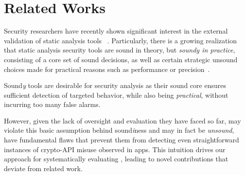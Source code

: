 \section{Related Works}
\label{ch1:sec:relatedworks}

Security researchers have recently shown significant interest in the external validation of static analysis tools
 ~\cite{QWR18,droidbench,iccbench,PBW18,bkm+18}. %
Particularly, there is a growing realization that static analysis security tools are sound in theory, but {\em soundy in practice}, \ie consisting of a core set of sound decisions, as well as certain strategic unsound choices made for practical reasons such as performance or precision~\cite{lss+15}.

Sound{\em y} tools are desirable for security analysis as their sound core ensures sufficient detection of targeted behavior, while also being {\em practical}, \ie without incurring too many false alarms.

However, given the lack of oversight and evaluation they have faced so far, {\em \detectors} may violate this basic assumption behind sound{\em i}ness and may in fact be {\em unsound}, \ie have fundamental flaws that prevent them from detecting even straightforward instances of crypto-API misuse observed in apps.
This intuition drives our approach for systematically evaluating \detectors, leading to novel contributions that deviate from related work.

